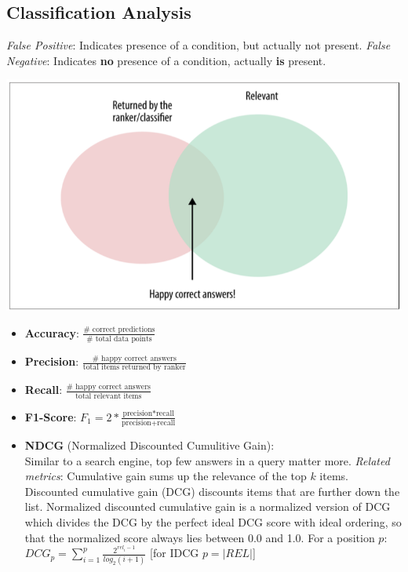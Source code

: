 \documentclass[english]{latex4ei/latex4ei_sheet}
\begin{document}
\begin{sectionbox}
\subsection{Classification Analysis}
\emph{False Positive}: Indicates presence of a condition, but actually not present.
\emph{False Negative}: Indicates \textbf{no} presence of a condition, actually \textbf{is} present.
\begin{center}
	\includegraphics[width = 1.0\columnwidth]{figures/precession_recall.png}
\end{center}
\begin{itemize}
    \item \textbf{Accuracy}: $\frac{\text{# correct predictions}}{\text{# total data points}}$
    \item \textbf{Precision}: $\frac{\text{# happy correct answers}}{\text{total items returned by ranker}}$
    \item \textbf{Recall}: $\frac{\text{# happy correct answers}}{\text{total relevant items}}$
    \item \textbf{F1-Score}: $F_1= 2*\frac{\text{precision*recall}}{\text{precision+recall}}$
    \item \textbf{NDCG} (Normalized Discounted Cumulitive Gain):\\
    Similar to a search engine, top few answers in a query matter more.
    \emph{Related metrics}: Cumulative gain sums up the relevance of the top $k$ items. Discounted cumulative gain (DCG) discounts items that are further down the list. Normalized discounted cumulative gain is a normalized version of DCG which divides the DCG by the perfect ideal  DCG score with ideal ordering, so that the normalized score always lies between 0.0 and 1.0. For a position $p$:
    $DCG_p=\sum_{i=1}^p\frac{2^{rel_i-1}}{log_2(i+1)}$ \hspace{5}[for IDCG $p=|REL|$]
\end{itemize}

\end{sectionbox}
\end{document}
